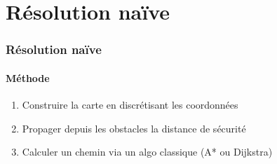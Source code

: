 \section{Résolution naïve}

\begin{frame}
    \tableofcontents[currentsection]
\end{frame}

\begin{frame}
\frametitle{Résolution naïve}
\framesubtitle{Méthode}

\begin{enumerate}
    \item<1-> Construire la carte en discrétisant les coordonnées
    \item<2-> Propager depuis les obstacles la distance de sécurité
    \item<3-> Calculer un chemin via un algo classique (A* ou Dijkstra)
\end{enumerate}

\begin{figure}
    \centering
    \qquad
\end{figure}

\end{frame}

